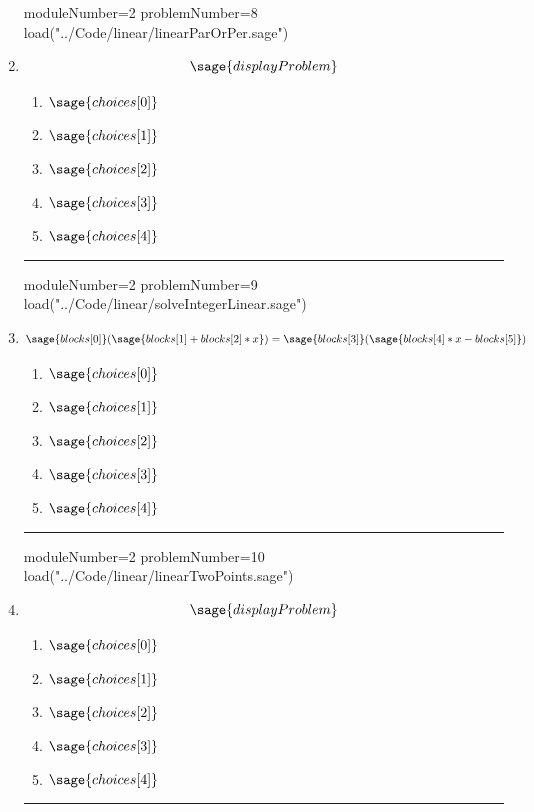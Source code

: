 \documentclass[14pt]{article}
\newcommand{\litem}[1]{\item#1\hspace*{-1cm}\rule{\textwidth}{0.4pt}}
\begin{document}
\begin{enumerate}
{}

\begin{sagesilent}
moduleNumber=2
problemNumber=8
load("../Code/linear/linearParOrPer.sage")
\end{sagesilent}

\litem{	

\[ \sage{displayProblem} \]

	\begin{enumerate}[label=\Alph*.]
    \item \( \sage{choices[0]} \)
    \item \( \sage{choices[1]} \)
    \item \( \sage{choices[2]} \)
    \item \( \sage{choices[3]} \)
    \item \( \sage{choices[4]} \)
	\end{enumerate}

}

\begin{sagesilent}
moduleNumber=2
problemNumber=9
load("../Code/linear/solveIntegerLinear.sage")
\end{sagesilent}

\litem{ 

	\[ \sage{blocks[0]}(\sage{blocks[1]+blocks[2]*x}) = \sage{blocks[3]}(\sage{blocks[4]*x-blocks[5]}) \]

	\begin{enumerate}[label=\Alph*.]
    \item \( \sage{choices[0]} \)
    \item \( \sage{choices[1]} \)
    \item \( \sage{choices[2]} \)
    \item \( \sage{choices[3]} \)
    \item \( \sage{choices[4]} \)
	\end{enumerate}

}

\begin{sagesilent}
moduleNumber=2
problemNumber=10
load("../Code/linear/linearTwoPoints.sage")
\end{sagesilent}

\litem{ 

\[ \sage{displayProblem} \]

	\begin{enumerate}[label=\Alph*.]
    \item \( \sage{choices[0]} \)
    \item \( \sage{choices[1]} \)
    \item \( \sage{choices[2]} \)
    \item \( \sage{choices[3]} \)
    \item \( \sage{choices[4]} \)
	\end{enumerate}
}

\end{enumerate}
\end{document}
